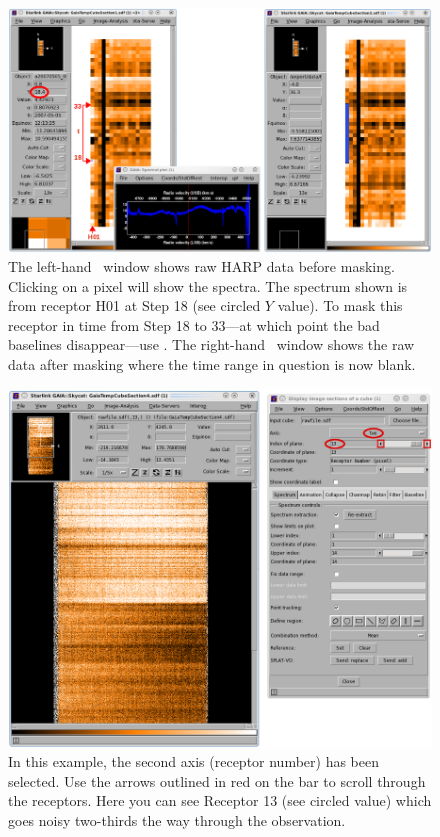 \documentclass[11pt,oneside,chapters]{starlink}
\begin{document}
\begin{figure}[h!]
\begin{center}
\includegraphics[width=1\linewidth]{sc20_maskreceptor}
\caption[Identifying bad receptors in the raw data.]{\label{fig:maskreceptor}
  The left-hand \gaia\ window shows raw HARP data before masking.
  Clicking on a pixel will show the spectra. The spectrum shown is from
  receptor H01 at Step 18 (see circled $Y$ value). To mask this receptor
  in time from Step 18 to 33---at which point the bad baselines
  disappear---use \chpix. The right-hand \gaia\ window shows the raw
  data after masking where the time range in question is now blank.}
\end{center}
\end{figure}

\begin{figure}[h!]
\begin{center}
\includegraphics[width=0.9\linewidth]{sc20_badreceptor2}
\caption[Identifying bad receptors in the raw data: second method.]{\label{fig:maskreceptor2}
  In this example, the second axis (receptor number) has been
  selected. Use the arrows outlined in red on the  bar to scroll through the receptors. Here you can see
  Receptor 13 (see circled  value) which
  goes noisy two-thirds the way through the observation.}
\end{center}
\end{figure}
\end{document}
